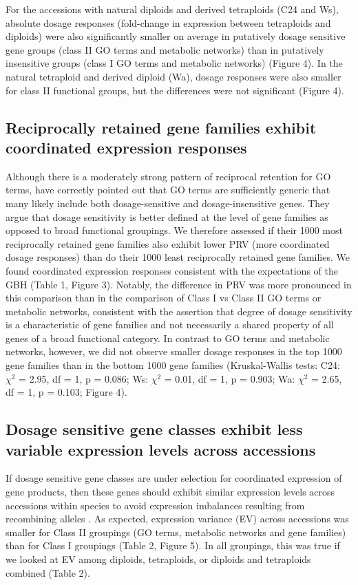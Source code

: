\documentclass[11pt]{article}
\begin{document}
For the accessions with natural diploids and derived tetraploids (C24 and Ws), absolute dosage responses (fold-change in expression between tetraploids and diploids) were also significantly smaller on average in putatively dosage sensitive gene groups (class II GO terms and metabolic networks) than in putatively insensitive groups (class I GO terms and metabolic networks) (Figure 4). In the natural tetraploid and derived diploid (Wa), dosage responses were also smaller for class II functional groups, but the differences were not significant (Figure 4).

\subsection*{Reciprocally retained gene families exhibit coordinated expression responses}

Although there is a moderately strong pattern of reciprocal retention for GO terms, \cite{tasdighian2017} have correctly pointed out that GO terms are sufficiently generic that many likely include both dosage-sensitive and dosage-insensitive genes. They argue that dosage sensitivity is better defined at the level of gene families as opposed to broad functional groupings. We therefore assessed if their 1000 most reciprocally retained gene families also exhibit lower PRV (more coordinated dosage responses) than do their 1000 least reciprocally retained gene families. We found coordinated expression responses consistent with the expectations of the GBH (Table 1, Figure 3). Notably, the difference in PRV was more pronounced in this comparison than in the comparison of Class I vs Class II GO terms or metabolic networks, consistent with the \cite{tasdighian2017} assertion that degree of dosage sensitivity is a characteristic of gene families and not necessarily a shared property of all genes of a broad functional category. 
	In contrast to GO terms and metabolic networks, however, we did not observe smaller dosage responses in the top 1000 gene families than in the bottom 1000 gene families (Kruskal-Wallis tests: C24: $\chi^2$ = 2.95,  df = 1, p = 0.086; Ws: $\chi^2$ = 0.01,  df = 1, p = 0.903; Wa: $\chi^2$ = 2.65,  df = 1, p = 0.103; Figure 4). 

\subsection*{Dosage sensitive gene classes exhibit less variable expression levels across accessions}

If dosage sensitive gene classes are under selection for coordinated expression of gene products, then these genes should exhibit similar expression levels across accessions within species to avoid expression imbalances resulting from recombining alleles \citep{coate2016}. As expected, expression variance (EV) across accessions was smaller for Class II groupings (GO terms, metabolic networks and gene families) than for Class I groupings (Table 2, Figure 5). In all groupings, this was true if we looked at EV among diploids, tetraploids, or diploids and tetraploids combined (Table 2).
\end{document}
